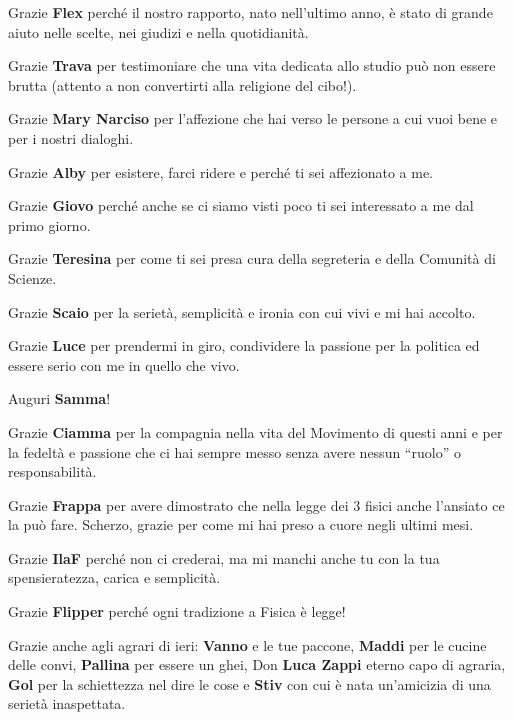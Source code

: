 Grazie \textbf{Flex} perché il nostro rapporto, nato nell'ultimo anno, è stato di grande aiuto nelle scelte, nei giudizi e nella quotidianità.

Grazie \textbf{Trava} per testimoniare che una vita dedicata allo studio può non essere brutta (attento a non convertirti alla religione del cibo!).

Grazie \textbf{Mary Narciso} per l'affezione che hai verso le persone a cui vuoi bene e per i nostri dialoghi.

Grazie \textbf{Alby} per esistere, farci ridere e perché ti sei affezionato a me.

Grazie \textbf{Giovo} perché anche se ci siamo visti poco ti sei interessato a me dal primo giorno.

Grazie \textbf{Teresina} per come ti sei presa cura della segreteria e della Comunità di Scienze.

Grazie \textbf{Scaio} per la serietà, semplicità e ironia con cui vivi e mi hai accolto.

Grazie \textbf{Luce} per prendermi in giro, condividere la passione per la politica ed essere serio con me in quello che vivo.

Auguri \textbf{Samma}!

Grazie \textbf{Ciamma} per la compagnia nella vita del Movimento di questi anni e per la fedeltà e passione che ci hai sempre messo senza avere nessun ``ruolo'' o responsabilità.

Grazie \textbf{Frappa} per avere dimostrato che nella legge dei 3 fisici anche l'ansiato ce la può fare. Scherzo, grazie per come mi hai preso a cuore negli ultimi mesi.

Grazie \textbf{IlaF} perché non ci crederai, ma mi manchi anche tu con la tua spensieratezza, carica e semplicità.

Grazie \textbf{Flipper} perché ogni tradizione a Fisica è legge!

Grazie anche agli agrari di ieri: \textbf{Vanno} e le tue paccone, \textbf{Maddi} per le cucine delle convi, \textbf{Pallina} per essere un ghei, Don \textbf{Luca Zappi} eterno capo di agraria, \textbf{Gol} per la schiettezza nel dire le cose e \textbf{Stiv} con cui è nata un'amicizia di una serietà inaspettata.

